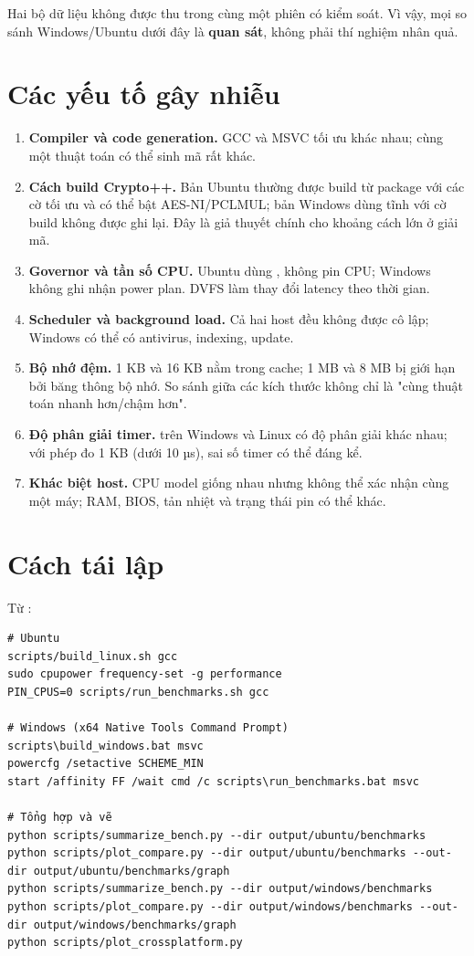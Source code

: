 \documentclass[12pt,a4paper,oneside]{report}
\let\origtexttt\texttt
\renewcommand{\texttt}[1]{\origtexttt{\seqsplit{#1}}}
\begin{document}
Hai bộ dữ liệu không được thu trong cùng một phiên có kiểm soát. Vì vậy, mọi so sánh Windows/Ubuntu dưới đây là \textbf{quan sát}, không phải thí nghiệm nhân quả.


\section{Các yếu tố gây nhiễu}


\begin{enumerate}[leftmargin=*]
\item \textbf{Compiler và code generation.} GCC và MSVC tối ưu khác nhau; cùng một thuật toán có thể sinh mã rất khác.
\item \textbf{Cách build Crypto++.} Bản Ubuntu thường được build từ package với các cờ tối ưu và có thể bật AES-NI/PCLMUL; bản Windows dùng \texttt{cryptlib.lib} tĩnh với cờ build không được ghi lại. Đây là giả thuyết chính cho khoảng cách lớn ở giải mã.
\item \textbf{Governor và tần số CPU.} Ubuntu dùng \texttt{powersave}, không pin CPU; Windows không ghi nhận power plan. DVFS làm thay đổi latency theo thời gian.
\item \textbf{Scheduler và background load.} Cả hai host đều không được cô lập; Windows có thể có antivirus, indexing, update.
\item \textbf{Bộ nhớ đệm.} 1 KB và 16 KB nằm trong cache; 1 MB và 8 MB bị giới hạn bởi băng thông bộ nhớ. So sánh giữa các kích thước không chỉ là "cùng thuật toán nhanh hơn/chậm hơn".
\item \textbf{Độ phân giải timer.} \texttt{steady\_clock} trên Windows và Linux có độ phân giải khác nhau; với phép đo 1 KB (dưới 10 µs), sai số timer có thể đáng kể.
\item \textbf{Khác biệt host.} CPU model giống nhau nhưng không thể xác nhận cùng một máy; RAM, BIOS, tản nhiệt và trạng thái pin có thể khác.
\end{enumerate}


\section{Cách tái lập}


Từ \texttt{lab01/}:


\begin{Verbatim}
# Ubuntu
scripts/build_linux.sh gcc
sudo cpupower frequency-set -g performance
PIN_CPUS=0 scripts/run_benchmarks.sh gcc

# Windows (x64 Native Tools Command Prompt)
scripts\build_windows.bat msvc
powercfg /setactive SCHEME_MIN
start /affinity FF /wait cmd /c scripts\run_benchmarks.bat msvc

# Tổng hợp và vẽ
python scripts/summarize_bench.py --dir output/ubuntu/benchmarks
python scripts/plot_compare.py --dir output/ubuntu/benchmarks --out-dir output/ubuntu/benchmarks/graph
python scripts/summarize_bench.py --dir output/windows/benchmarks
python scripts/plot_compare.py --dir output/windows/benchmarks --out-dir output/windows/benchmarks/graph
python scripts/plot_crossplatform.py
\end{Verbatim}
\end{document}
